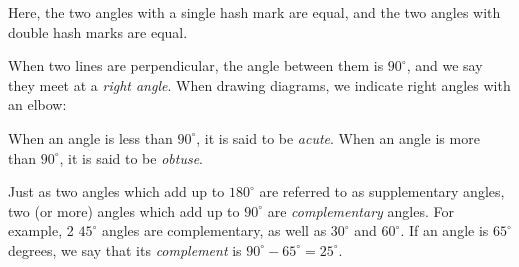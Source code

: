 Here, the two angles with a single hash mark are equal, and the two angles with 
double hash marks are equal.

When two lines are perpendicular, the angle between them is $90^\circ$, and we 
say they meet at a \emph{right angle}. When drawing diagrams, we indicate right
angles with an elbow:

\begin{center}
\end{center}

 
When an angle is less than $90^\circ$, it is said to be
\emph{acute}. When an angle is more than $90^\circ$, it is said to be
\emph{obtuse}.

Just as two angles which add up to $180^\circ$ are referred to as supplementary angles,
two (or more) angles which add up to $90^\circ$ are \emph{complementary} angles. For example, 2 $45^\circ$ angles are complementary, as well as $30^\circ$ and $60^\circ$. If an angle is $65^\circ$ degrees, we say that its \emph{complement} is $90^\circ-65^\circ=25^\circ$.

\begin{center}
\hspace{2cm}
\end{center}


